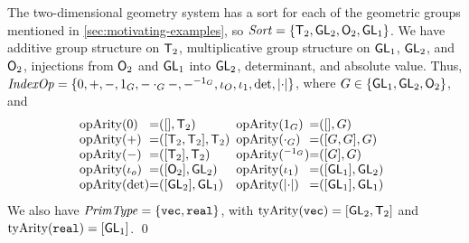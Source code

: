 \begin{example*}
  \label{ex:two-dim-geo-operations}
  The two-dimensional geometry system has a sort for each of the
  geometric groups mentioned in \autoref{sec:motivating-examples}, so
  $\mathit{Sort} = \{\mathsf{T}_2, \mathsf{GL}_2, \mathsf{O}_2, \mathsf{GL}_1 \}$.
  We have additive group structure on $\mathsf{T}_2$, multiplicative
  group structure on $\mathsf{GL}_1$, $\mathsf{GL}_2$, and $\mathsf{O}_2$,
  injections from $\mathsf{O}_2$ and $\mathsf{GL}_1$ into $\mathsf{GL}_2$,
  determinant, and absolute value. Thus, $\mathit{IndexOp} = \{ 0, +, -,
  1_G, -\cdot_G-, -^{-1_G}, \iota_O, \iota_1, \det, \lvert \cdot \rvert \}$, where
  $G \in \{\mathsf{GL}_1, \mathsf{GL}_2, \mathsf{O}_2\}$, and
  \begin{displaymath}
    \begin{array}{@{}l@{\hspace{0em}=\hspace{0em}}l@{\hspace{0.5em}}l@{\hspace{0em}=\hspace{0em}}l}
      \indexOpArity(0) & ([], \SynTransl{2}) &
      \indexOpArity(1_G) & ([], G) \\
      \indexOpArity(+) & ([\SynTransl{2}, \SynTransl{2}], \SynTransl{2}) &
      \indexOpArity(\cdot_G) & ([G,G],G) \\
      \indexOpArity(-) & ([\SynTransl{2}], \SynTransl{2}) &
      \indexOpArity(^{-1_G}) & ([G], G) \\
      \indexOpArity(\iota_o) & ([\SynOrth{2}], \SynGL{2}) &
      \indexOpArity(\iota_1) & ([\SynGL{1}], \SynGL{2}) \\
      \indexOpArity(\det) & ([\SynGL{2}], \SynGL{1}) &
      \indexOpArity(\abs{\cdot}) & ([\SynGL{1}], \SynGL{1})
    \end{array}
  \end{displaymath}
We also have $\mathit{PrimType} = \{ \textup{\texttt{vec}},
  \textup{\texttt{real}} \}$, with $\mathrm{tyArity}(\textup{\texttt{vec}}) =
           [\mathsf{GL}_2, \mathsf{T}_2]$ and
           $\mathrm{tyArity}(\textup{\texttt{real}}) = [\mathsf{GL}_1]$.
\qed
\end{example*}

